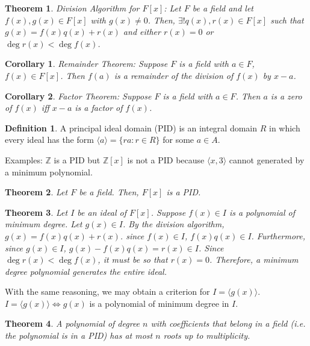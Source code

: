 \documentclass{article}
\theoremstyle{definition}
\newtheorem{definition}{Definition}
\theoremstyle{plain}
\newtheorem{theorem}{Theorem}
\theoremstyle{corollary}
\newtheorem{corollary}{Corollary}
\theoremstyle{lemma}
\begin{document}
\begin{theorem}
    Division Algorithm for $F[x]$: Let $F$ be a field and let $f(x),g(x)\in F[x]$ with $g(x)\neq0$. Then, $\exists!q(x),r(x)\in F[x]$ such that $g(x)=f(x)q(x)+r(x)$ and either $r(x)=0$ or $\deg r(x)<\deg f(x)$.
\end{theorem}

\begin{corollary}
    Remainder Theorem: Suppose $F$ is a field with $a\in F$, $f(x)\in F[x]$. Then $f(a)$ is a remainder of the division of $f(x)$ by $x-a$.
\end{corollary}

\begin{corollary}
    Factor Theorem: Suppose $F$ is a field with $a\in F$. Then $a$ is a zero of $f(x)$ iff $x-a$ is a factor of $f(x)$.
\end{corollary}

\begin{definition}
    A principal ideal domain (PID) is an integral domain $R$ in which every ideal has the form $\langle a\rangle=\{ra:r\in R\}$ for some $a\in A$.
\end{definition}

Examples: $\mathbb{Z}$ is a PID but $\mathbb{Z}[x]$ is not a PID because $\langle x,3\rangle$ cannot generated by a minimum polynomial.

\begin{theorem}
   Let $F$ be a field. Then, $F[x]$ is a PID. 
\end{theorem}

\begin{theorem}
    Let $I$ be an ideal of $F[x]$. Suppose $f(x)\in I$ is a polynomial of minimum degree. Let $g(x)\in I$. By the division algorithm, $g(x)=f(x)q(x)+r(x)$. since $f(x)\in I$, $f(x)q(x)\in I$. Furthermore, since $g(x)\in I$, $g(x)-f(x)q(x)=r(x)\in I$. Since $\deg r(x)<\deg f(x)$, it must be so that $r(x)=0$. Therefore, a minimum degree polynomial generates the entire ideal.
\end{theorem}

With the same reasoning, we may obtain a criterion for $I=\langle g(x)\rangle$. $I=\langle g(x)\rangle\iff g(x)$ is a polynomial of minimum degree in $I$.

\begin{theorem}
    A polynomial of degree $n$ with coefficients that belong in a field (i.e. the polynomial is in a PID) has at most $n$ roots up to multiplicity.
\end{theorem}
\end{document}
